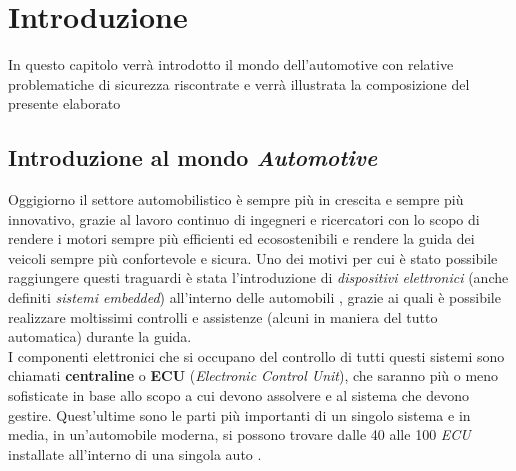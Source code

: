 \chapter{Introduzione}
\begin{citazione}
    In questo capitolo verrà introdotto il mondo dell'automotive con relative problematiche di sicurezza riscontrate e verrà illustrata la composizione del presente elaborato
\end{citazione}

\section{Introduzione al mondo \emph{Automotive}}
Oggigiorno il settore automobilistico è sempre più in crescita e sempre più innovativo, grazie al lavoro continuo di ingegneri e ricercatori con lo scopo di rendere i motori sempre più efficienti ed ecosostenibili e rendere la guida dei veicoli sempre più confortevole e sicura. Uno dei motivi per cui è stato possibile raggiungere questi traguardi è stata l'introduzione di \emph{dispositivi elettronici} (anche definiti \emph{sistemi embedded}) all'interno delle automobili \cite{auto_electronics}, grazie ai quali è possibile realizzare moltissimi controlli e assistenze (alcuni in maniera del tutto automatica) durante la guida.\\
I componenti elettronici che si occupano del controllo di tutti questi sistemi sono chiamati \textbf{centraline} o \textbf{ECU} (\emph{Electronic Control Unit}), che saranno più o meno sofisticate in base allo scopo a cui devono assolvere e al sistema che devono gestire. Quest'ultime sono le parti più importanti di un singolo sistema e in media, in un'automobile moderna, si possono trovare dalle 40 alle 100 \emph{ECU} installate all'interno di una singola auto \cite{auto_electronics}.

